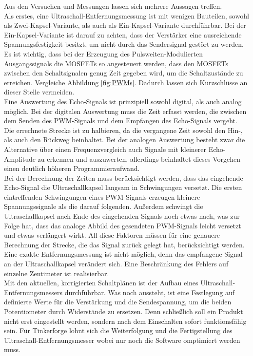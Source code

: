 Aus den Versuchen und Messungen lassen sich mehrere Aussagen treffen. \\
Als erstes, eine Ultraschall-Entfernungsmessung ist mit wenigen Bauteilen, sowohl als Zwei-Kapsel-Variante, als auch als Ein-Kapsel-Variante durchführbar. Bei der Ein-Kapsel-Variante ist darauf zu achten, dass der Verstärker eine ausreichende Spannungsfestigkeit besitzt, um nicht durch das Sendersignal gestört zu werden. Es ist wichtig, dass bei der Erzeugung des Pulsweiten-Modulierten Ausgangssignals die MOSFETs so angesteuert werden, dass den MOSFETs zwischen den Schaltsignalen genug Zeit gegeben wird, um die Schaltzustände zu erreichen. Vergleiche Abbildung \ref{fig:PWMs}. Dadurch lassen sich Kurzschlüsse an dieser Stelle vermeiden.\\
Eine Auswertung des Echo-Signals ist prinzipiell sowohl digital, als auch analog möglich. Bei der digitalen Auswertung muss die Zeit erfasst werden, die zwischen dem Senden des PWM-Signals und dem Empfangen des Echo-Signals vergeht. Die errechnete Strecke ist zu halbieren, da die vergangene Zeit sowohl den Hin-, als auch den Rückweg beinhaltet. Bei der analogen Auswertung besteht zwar die Alternative über einen Frequenzvergleich auch Signale mit kleinerer Echo-Amplitude zu erkennen und auszuwerten, allerdings beinhaltet dieses Vorgehen einen deutlich höheren Programmieraufwand.\\
Bei der Berechnung der Zeiten muss berücksichtigt werden, dass das eingehende Echo-Signal die Ultraschallkapsel langsam in Schwingungen versetzt. Die ersten eintreffenden Schwingungen eines PWM-Signals erzeugen kleinere Spannungssignale als die darauf folgenden. Außerdem schwingt die Ultraschallkapsel nach Ende des eingehenden Signals noch etwas nach, was zur Folge hat, dass das analoge Abbild des gesendeten PWM-Signals leicht versetzt und etwas verlängert wirkt. All diese Faktoren müssen für eine genauere Berechnung der Strecke, die das Signal zurück gelegt hat, berücksichtigt werden. Eine exakte Entfernungsmessung ist nicht möglich, denn das empfangene Signal an der Ultraschallkapsel verändert sich. Eine Beschränkung des Fehlers auf einzelne Zentimeter ist realisierbar.\\
Mit den aktuellen, korrigierten Schaltplänen ist der Aufbau eines Ultraschall-Entfernungsmessers durchführbar. Was noch aussteht, ist eine Festlegung auf definierte Werte für die Verstärkung und die Sendespannung, um die beiden Potentiometer durch Widerstände zu ersetzen. Denn schließlich soll ein Produkt nicht erst eingestellt werden, sondern nach dem Einschalten sofort funktionsfähig sein. 
%
Für Tinkerforge lohnt sich die Weiterfolgung und die Fertigstellung des Ultraschall-Entfernungsmesser wobei nur noch die Software omptimiert werden muss.
